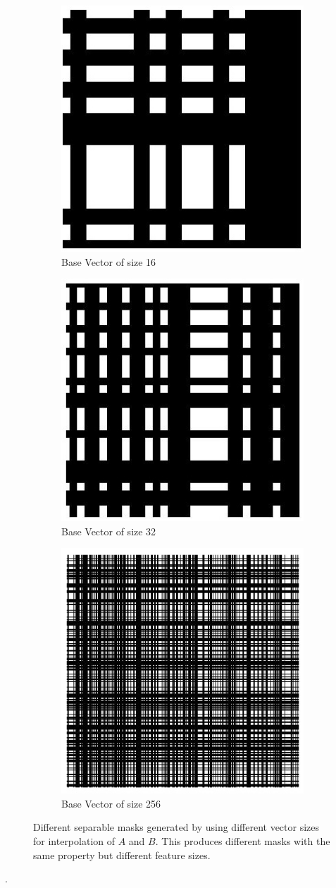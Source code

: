   \begin{figure}[ht]
    \centering
    \begin{subfigure}{0.5\textwidth}
    \centering
        \includegraphics[width=0.5\linewidth]{pics/mask_16}
        \caption{Base Vector of size 16}        
        \label{fig:mask-16}
    \end{subfigure}%
    \begin{subfigure}{0.5\textwidth}
    \centering
        \includegraphics[width=0.5\linewidth]{pics/mask_32}
        \caption{Base Vector of size 32}
        \label{fig:mask-32}
    \end{subfigure}
    
    \begin{subfigure}{0.5\textwidth}
    \centering
        \includegraphics[width=0.5\linewidth]{pics/mask_256}
        \caption{Base Vector of size 256}        
        \label{fig:mask-256}
    \end{subfigure}%
    \caption{Different separable masks generated by using different vector sizes for interpolation of $A$ and $B$. This produces different masks with the same property but different feature sizes.}
    \label{fig:sep_mask_multi}
    \end{figure}. 
    
